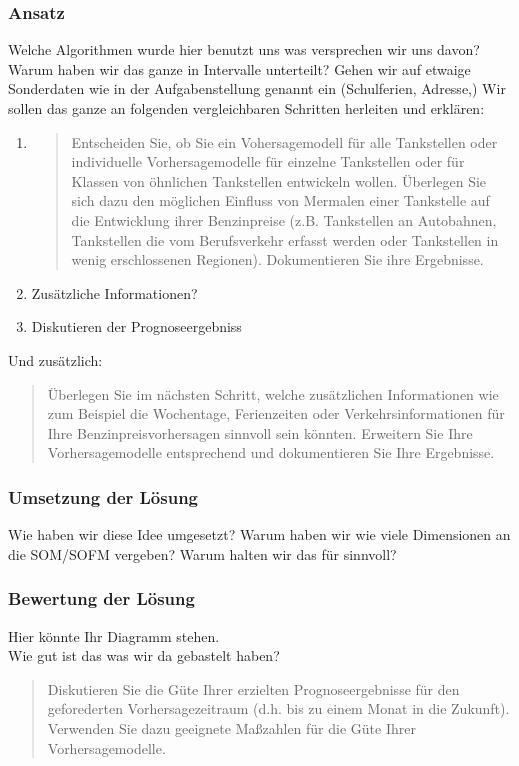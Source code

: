\documentclass[11pt]{article}
\begin{document}
\subsubsection{Ansatz}
	Welche Algorithmen wurde hier benutzt uns was versprechen wir uns davon? Warum haben wir das ganze in Intervalle unterteilt? Gehen wir auf etwaige Sonderdaten wie in der Aufgabenstellung genannt ein (Schulferien, Adresse,) 
	\newline
	\newline
	Wir sollen das ganze an folgenden vergleichbaren Schritten herleiten und erklären:
	\begin{enumerate}
		\item \begin{quote}
			Entscheiden Sie, ob Sie ein Vohersagemodell für alle Tankstellen oder individuelle Vorhersagemodelle für einzelne Tankstellen oder für Klassen von öhnlichen Tankstellen entwickeln wollen. Überlegen Sie sich dazu den möglichen Einfluss von Mermalen einer Tankstelle auf die Entwicklung ihrer Benzinpreise (z.B. Tankstellen an Autobahnen, Tankstellen die vom Berufsverkehr erfasst werden oder Tankstellen in wenig erschlossenen Regionen). Dokumentieren Sie ihre Ergebnisse.
		\end{quote}
		\item Zusätzliche Informationen?
		\item Diskutieren der Prognoseergebniss
	\end{enumerate}
	
	Und zusätzlich:
	\begin{quote}
		Überlegen Sie im nächsten Schritt, welche zusätzlichen Informationen wie zum Beispiel die Wochentage, Ferienzeiten oder Verkehrsinformationen für Ihre Benzinpreisvorhersagen sinnvoll sein könnten. Erweitern Sie Ihre Vorhersagemodelle entsprechend und dokumentieren Sie Ihre Ergebnisse.
	\end{quote}
\subsubsection{Umsetzung der Lösung}
	Wie haben wir diese Idee umgesetzt? Warum haben wir wie viele Dimensionen an die SOM/SOFM vergeben? Warum halten wir das für sinnvoll?
\subsubsection{Bewertung der Lösung}
	Hier könnte Ihr Diagramm stehen. \\
	Wie gut ist das was wir da gebastelt haben?
	\begin{quote}
		Diskutieren Sie die Güte Ihrer erzielten Prognoseergebnisse für den geforederten Vorhersagezeitraum (d.h. bis zu einem Monat in die Zukunft). Verwenden Sie dazu geeignete Maßzahlen für die Güte Ihrer Vorhersagemodelle.
	\end{quote}
\end{document}
